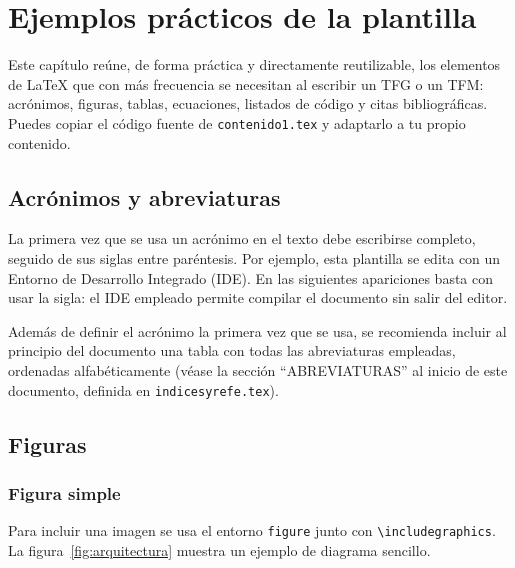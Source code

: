 
\chapter{Ejemplos prácticos de la plantilla}
\label{cap:ejemplos}

Este capítulo reúne, de forma práctica y directamente reutilizable, los elementos de \LaTeX{} que con más frecuencia se necesitan al escribir un TFG o un TFM: acrónimos, figuras, tablas, ecuaciones, listados de código y citas bibliográficas. Puedes copiar el código fuente de \texttt{contenido1.tex} y adaptarlo a tu propio contenido.

\section{Acrónimos y abreviaturas}
\label{sec:acronimos}

La primera vez que se usa un acrónimo en el texto debe escribirse completo, seguido de sus siglas entre paréntesis. Por ejemplo, esta plantilla se edita con un Entorno de Desarrollo Integrado (IDE). En las siguientes apariciones basta con usar la sigla: el IDE empleado permite compilar el documento sin salir del editor.

Además de definir el acrónimo la primera vez que se usa, se recomienda incluir al principio del documento una tabla con todas las abreviaturas empleadas, ordenadas alfabéticamente (véase la sección ``ABREVIATURAS'' al inicio de este documento, definida en \texttt{indicesyrefe.tex}).

\section{Figuras}
\label{sec:figuras}

\subsection{Figura simple}

Para incluir una imagen se usa el entorno \texttt{figure} junto con \lstinline[language=enparrafo]!\includegraphics!. La figura~\ref{fig:arquitectura} muestra un ejemplo de diagrama sencillo.

